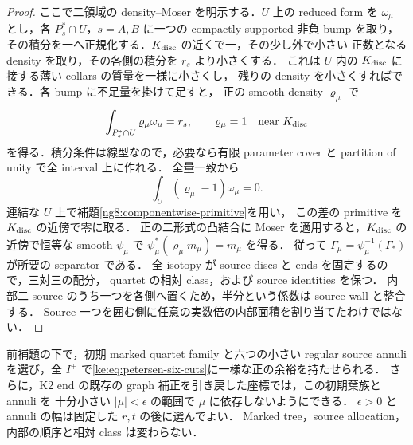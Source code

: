 \begin{proof}
ここで二領域の density--Moser を明示する．$U$ 上の reduced form を $\omega_\mu$
とし，各 $P_s^*\cap U$，$s=A,B$ に一つの compactly supported 非負 bump を取り，
その積分を一へ正規化する．$K_{\rm disc}$ の近くで一，その少し外で小さい
正数となる density を取り，その各側の積分を $r_s$ より小さくする．
これは $U$ 内の $K_{\rm disc}$ に接する薄い collars の質量を一様に小さくし，
残りの density を小さくすればできる．各 bump に不足量を掛けて足すと，
正の smooth density $\varrho_\mu$ で
\[
 \int_{P_s^*\cap U}\varrho_\mu\omega_\mu=r_s,\qquad
 \varrho_\mu=1\quad\hbox{near }K_{\rm disc}
\]
を得る．積分条件は線型なので，必要なら有限 parameter cover と
partition of unity で全 interval 上に作れる．
全量一致から
\[
 \int_U(\varrho_\mu-1)\omega_\mu=0 .
\]
連結な $U$ 上で補題\ref{ng8:componentwise-primitive}を用い，
この差の primitive を $K_{\rm disc}$ の近傍で零に取る．
正の二形式の凸結合に Moser を適用すると，$K_{\rm disc}$ の近傍で恒等な
smooth $\psi_\mu$ で $\psi_\mu^*(\varrho_\mu m_\mu)=m_\mu$ を得る．
従って $\Gamma_\mu=\psi_\mu^{-1}(\Gamma_*)$ が所要の separator である．
全 isotopy が source discs と ends を固定するので，三対三の配分，
quartet の相対 class，および source identities を保つ．
内部二 source のうち一つを各側へ置くため，半分という係数は source wall と整合する．
Source 一つを囲む側に任意の実数倍の内部面積を割り当てたわけではない．
\end{proof}

\begin{lemma}
\label{ke:petersen-thin-source-block}
前補題の下で，初期 marked quartet family と六つの小さい regular source annuli
を選び，全 $I^+$ で\eqref{ke:eq:petersen-six-cuts}に一様な正の余裕を持たせられる．
さらに，K2 end の既存の graph 補正を引き戻した座標では，この初期葉族と annuli を
十分小さい $|\mu|<\epsilon$ の範囲で $\mu$ に依存しないようにできる．
$\epsilon>0$ と annuli の幅は固定した $r,t$ の後に選んでよい．
Marked tree，source allocation，内部の順序と相対 class は変わらない．
\end{lemma}

